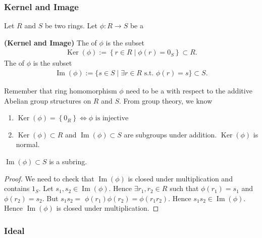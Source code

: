 \documentclass{article}
\newcommand{\bfs}[1]{\textbf{({#1}) }}
\newcommand{\Ker}{\operatorname{Ker}}
\begin{document}
\subsubsection{Kernel and Image}
Let $R$ and $S$ be two rings. Let $\phi: R \rightarrow S$ be a 
\begin{defa}\bfs{Kernel and Image}
 The  of $\phi$ is the subset
\begin{align*}
\Ker(\phi):=\left\{r \in R \mid \phi(r)=0_{S}\right\} \subset R .
\end{align*}
The  of $\phi$ is the subset
\begin{align*}
\operatorname{Im}(\phi):=\{s \in S \mid \exists r \in R \text { s.t. } \phi(r)=s\} \subset S .
\end{align*}
\end{defa}
\begin{rema}
Remember that ring homomorphism $\phi$ need to be a  with respect to the additive Abelian group structures on $R$ and $S$. From group theory, we know
\begin{enumerate}
    \item $\Ker(\phi)=\left\{0_{R}\right\} \Longleftrightarrow \phi \text { is injective }$
\item $\Ker(\phi) \subset R$ and $\operatorname{Im}(\phi) \subset S$ are subgroups under addition. $\Ker(\phi)$ is normal.
\end{enumerate}
\end{rema}
\begin{lema}
$\operatorname{Im}(\phi) \subset S$ is a subring.
\end{lema}
\begin{proof}
We need to check that $\operatorname{Im}(\phi)$ is closed under multiplication and contains $1_{S}$. Let $s_{1}, s_{2} \in \operatorname{Im}(\phi)$. Hence $\exists r_{1}, r_{2} \in R$ such that $\phi\left(r_{1}\right)=s_{1}$ and $\phi\left(r_{2}\right)=s_{2}$. But $s_{1} s_{2}=$ $\phi\left(r_{1}\right) \phi\left(r_{2}\right)=\phi\left(r_{1} r_{2}\right)$. Hence $s_{1} s_{2} \in \operatorname{Im}(\phi)$. Hence $\operatorname{Im}(\phi)$ is closed under multiplication.
\end{proof}




\subsubsection{Ideal}\label{sssec:ideal}
\end{document}
